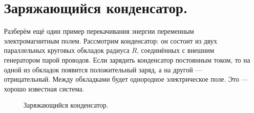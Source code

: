 \documentclass[11pt,a4paper]{article}
\numberwithin{equation}{section}
\begin{document}
\section{Заряжающийся конденсатор.}
\label{sec:condensator}

Разберём ещё один пример перекачивания энергии переменным
электромагнитным полем. Рассмотрим конденсатор: он состоит из двух
параллельных круговых обкладок радиуса $R$, соединённых с внешним
генератором парой проводов. Если зарядить конденсатор постоянным
током, то на одной из обкладок появится положительный заряд, а на
другой --- отрицательный. Между обкладками будет однородное
электрическое поле. Это --- хорошо известная система. 

\begin{figure}[h]
  \centering
  \hspace{2cm}
  \caption{Заряжающийся конденсатор.}
  \label{fig:cond}
\end{figure}
\end{document}
